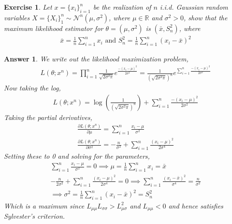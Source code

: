 \documentclass[12pt]{article}
\theoremstyle{colon}
\newtheorem{exercise}{Exercise}
\newtheorem*{answer}{Answer}
\begin{document}
\clearpage

\begin{exercise}
  Let $x = \{ x_i \}_{i = 1}^n$ be the realization of $n$ i.i.d. Gaussian random variables $X = \{ X_i \}_1^n \sim \mathcal{N}^n (\mu, \sigma^2)$, where $\mu \in \mathbb{R}$ and $\sigma^2 > 0$, show that the maximum likelihood estimator for $\theta = (\mu, \sigma^2)$ is $(\bar{x}, S_n^2)$, where
  \begin{gather*}
    \bar{x} = \frac{1}{n} \sum_{i = 1}^n x_i \text{ and } S_n^2 = \frac{1}{n} \sum_{i = 1}^n (x_i - \bar{x})^2
  \end{gather*}
\end{exercise}

\begin{answer}
  We write out the likelihood maximization problem,
  \begin{gather*}
    L(\theta; x^n) = \prod_{i=1}^n \frac{1}{\sqrt{2 \sigma^2 \pi}} e^{\frac{-(x_i - \mu)^2}{2\sigma^2}} = \frac{1}{\left( \sqrt{2 \sigma^2 \pi} \right)^n} e^{\sum_{i=1}^n \frac{-(x_i - \mu)^2}{2\sigma^2}}
  \end{gather*}
  Now taking the log,
  \begin{gather*}
    L(\theta; x^n) = \log \left( \frac{1}{\left( \sqrt{2 \sigma^2 \pi} \right)^n} \right) + \sum_{i=1}^n \frac{-(x_i - \mu)^2}{2\sigma^2}
  \end{gather*}
  Taking the partial derivatives,
  \begin{gather*}
    \frac{\partial L(\theta; x^n)}{\partial \mu} = \sum_{i=1}^n \frac{x_i - \mu}{\sigma^2} \\
    \frac{\partial L(\theta; x^n)}{\partial \sigma^2} = -\frac{n}{\sigma^2} + \sum_{i=1}^n \frac{(x_i - \mu)^2}{2\sigma^4}
  \end{gather*}
  Setting these to 0 and solving for the parameters,
  \begin{gather*}
    \sum_{i=1}^n \frac{x_i - \mu}{\sigma^2} = 0 \implies \mu = \frac{1}{n} \sum_{i=1}^n x_i = \bar{x} \\
    -\frac{n}{2\sigma^2} + \sum_{i=1}^n \frac{(x_i - \mu)^2}{2\sigma^4} = 0 \implies \sum_{i=1}^n \frac{(x_i - \bar{x})^2}{\sigma^4} = \frac{n}{\sigma^2} \\
    \implies \sigma^2 = \frac{1}{n} \sum_{i=1}^n (x_i - \bar{x})^2 = S_n^2
  \end{gather*}
  Which is a maximum since $L_{\mu\mu}L_{\sigma\sigma} > L_{\mu\sigma}^2$ and $L_{\mu\mu} < 0$ and hence satisfies Sylvester's criterion.
\end{answer}
\end{document}
